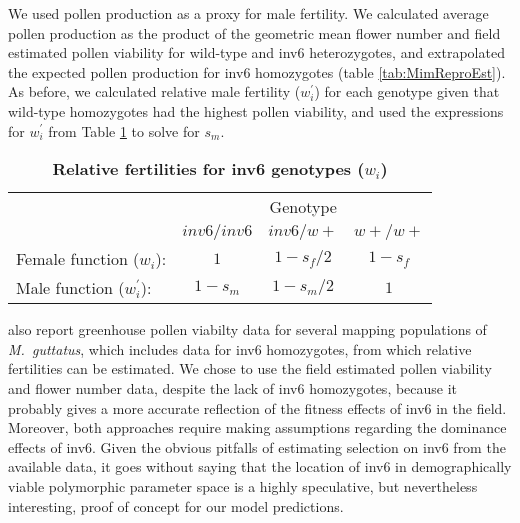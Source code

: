 \documentclass[11pt]{article}
\begin{document}
We used pollen production as a proxy for male fertility. We calculated average pollen production as the product of the geometric mean flower number and field estimated pollen viability for wild-type and inv6 heterozygotes, and extrapolated the expected pollen production for inv6 homozygotes (table \ref{tab:MimReproEst}). As before, we calculated relative male fertility ($w^{\prime}_i$) for each genotype given that wild-type homozygotes had the highest pollen viability, and used the expressions for $w^{\prime}_{i}$ from Table \ref{tab:inv6Fitness} to solve for $s_m$.

\begin{table}[htbp]
 \centering
 \caption{\bf Relative fertilities for inv6 genotypes ($w_{i}$)}
\label{tab:inv6Fitness}
\begin{tabular}{lccc}
 \toprule
					&  \multicolumn{3}{c}{{Genotype}} \\ 
\cline{2-4}
									& $inv6/inv6$	& $inv6/w+$		& $w+/w+$ 	\\ \hline
Female function ($w_{i}$):			& $1$			& $1 - s_f/2$	& $1 - s_f$ \\	
Male function ($w^{\prime}_{i}$):	& $1 - s_m$		& $1 - s_m/2$	& $1$ 		\\	
\hline
\end{tabular}
\end{table}

\citet{LeeKelly2015} also report greenhouse pollen viabilty data for several mapping populations of {\itshape M.~guttatus}, which includes data for inv6 homozygotes, from which relative fertilities can be estimated. We chose to use the field estimated pollen viability and flower number data, despite the lack of inv6 homozygotes, because it probably gives a more accurate reflection of the fitness effects of inv6 in the field. Moreover, both approaches require making assumptions regarding the dominance effects of inv6. Given the obvious pitfalls of estimating selection on inv6 from the available data, it goes without saying that the location of inv6 in demographically viable polymorphic parameter space is a highly speculative, but nevertheless interesting, proof of concept for our model predictions.






%
%
\newpage{}

\end{document}
